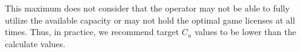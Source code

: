 


This maximum does not consider that the operator may not be able to fully utilize the available capacity or may not hold the optimal game licenses at all times. Thus, in practice, we recommend target $C_{u}$ values to be lower than the calculate values.




